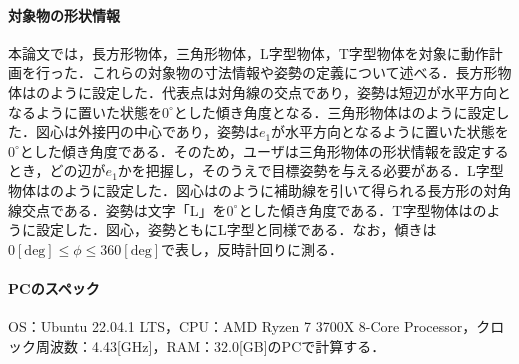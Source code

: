 \documentclass[a4paper,twoside,12pt,papersize, dvipdfmx]{iirthesis}
\begin{document}
\paragraph{対象物の形状情報}
本論文では，長方形物体，三角形物体，L字型物体，T字型物体を対象に動作計画を行った．これらの対象物の寸法情報や姿勢の定義について述べる．長方形物体はのように設定した．代表点は対角線の交点であり，姿勢は短辺が水平方向となるように置いた状態を$0^\circ$とした傾き角度となる．三角形物体はのように設定した．図心は外接円の中心であり，姿勢は$e_1$が水平方向となるように置いた状態を$0^\circ$とした傾き角度である．そのため，ユーザは三角形物体の形状情報を設定するとき，どの辺が$e_1$かを把握し，そのうえで目標姿勢を与える必要がある．L字型物体はのように設定した．図心はのように補助線を引いて得られる長方形の対角線交点である．姿勢は文字「L」を$0^\circ$とした傾き角度である．T字型物体はのように設定した．図心，姿勢ともにL字型と同様である．なお，傾きは$0 \mathrm{[deg]} \leq \phi \leq 360 \mathrm{[deg]}$で表し，反時計回りに測る．

\paragraph{PCのスペック}
OS：Ubuntu 22.04.1 LTS，CPU：AMD Ryzen 7 3700X 8-Core Processor，クロック周波数：4.43[GHz]，RAM：32.0[GB]のPCで計算する．
\end{document}

